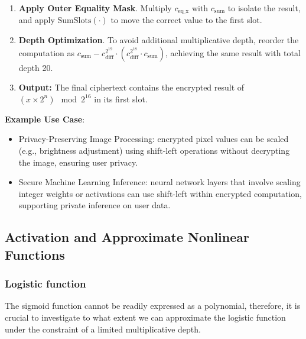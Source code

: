 \documentclass[article]{iacrtrans}
\begin{document}
\begin{enumerate}
    \item \textbf{Apply Outer Equality Mask}. Multiply $c_{\text{eq\_x}}$ with $c_{\text{sum}}$ to isolate the result, and apply $\text{SumSlots}(\cdot)$ to move the correct value to the first slot.
    
    \item \textbf{Depth Optimization}. To avoid additional multiplicative depth, reorder the computation as $c_{\text{sum}} - c_{\text{diff}}^{2^{19}} \cdot (c_{\text{diff}}^{2^{18}} \cdot c_{\text{sum}})$, achieving the same result with total depth 20.
    
    \item \textbf{Output:}  
    The final ciphertext contains the encrypted result of $(x \times 2^n) \mod 2^{16}$ in its first slot.
\end{enumerate}

\textbf{Example Use Case}:
\begin{itemize}
    \item Privacy-Preserving Image Processing: encrypted pixel values can be scaled (e.g., brightness adjustment) using shift-left operations without decrypting the image, ensuring user privacy.
    \item Secure Machine Learning Inference: neural network layers that involve scaling integer weights or activations can use shift-left within encrypted computation, supporting private inference on user data.
\end{itemize}

\subsection{Activation and Approximate Nonlinear Functions}
\subsubsection{Logistic function}
The sigmoid function cannot be readily expressed as a polynomial, therefore, it is crucial to investigate to what extent we can approximate the logistic function under the constraint of a limited multiplicative depth.
\end{document}
